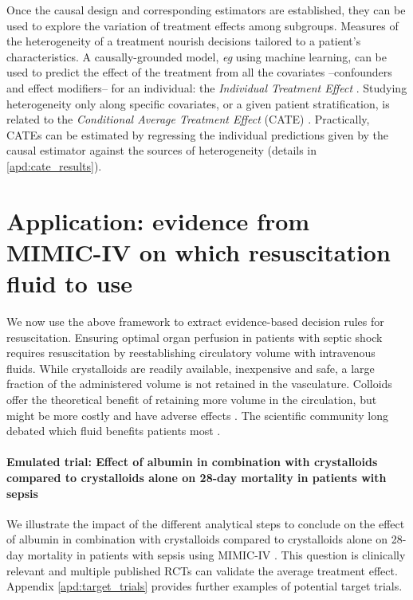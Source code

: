 \documentclass[french,12pt,twoside,a4paper]{book}
\begin{document}
Once the causal design and corresponding estimators are established, they can be
used to explore the variation of treatment effects among subgroups. Measures of
the heterogeneity of a treatment nourish decisions tailored to a patient's
characteristics. A causally-grounded model, \emph{eg} using machine learning,
can be used to predict the effect of the treatment from all the covariates
--confounders and effect modifiers-- for an individual: the \emph{Individual
  Treatment Effect} \citep[ITE][]{lu2018estimating}. Studying heterogeneity only
along specific covariates, or a given patient stratification, is related to the
\emph{Conditional Average Treatment Effect} (CATE)
\citep{robertson2021assessing}. Practically, CATEs can be estimated by
regressing the individual predictions given by the causal estimator against the
sources of heterogeneity (details in \ref{apd:cate_results}).


\section{Application: evidence from MIMIC-IV on which resuscitation fluid to
  use}%
\label{sec:causal_tuto:application}%

We now use the above framework to extract evidence-based decision
rules for resuscitation.
Ensuring optimal organ perfusion in patients with septic shock requires
resuscitation by reestablishing circulatory volume with intravenous fluids.
While crystalloids are readily available, inexpensive and safe, a large fraction
of the administered volume is not retained in the vasculature. Colloids
offer the theoretical benefit of retaining more volume in the circulation, but
might be more costly and have adverse effects \citep{annane2013effects}. The
scientific community long debated which fluid benefits patients most
\citep{mandel2023treatment}.

\paragraph{Emulated trial: Effect of albumin in combination with crystalloids
  compared to crystalloids alone on 28-day mortality in patients with sepsis}\label{emulated_trial}

We illustrate the impact of the different analytical steps to conclude
on the effect of albumin in combination with crystalloids compared to
crystalloids alone on 28-day mortality in patients with sepsis using MIMIC-IV
\citep{johnson2020mimic}. This question is clinically relevant and
multiple published RCTs
can validate the average treatment effect.
Appendix \ref{apd:target_trials} provides further examples of
potential target trials.
\end{document}
